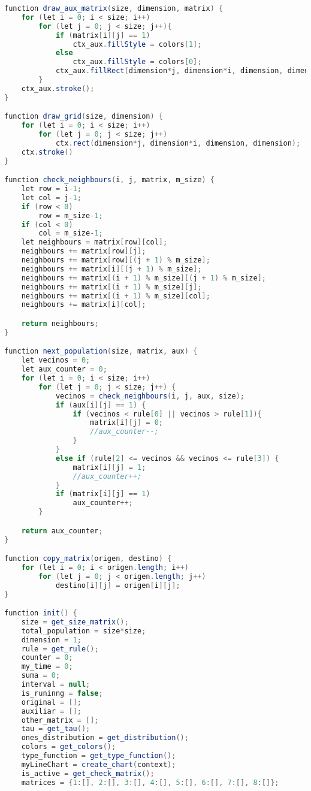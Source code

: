 \documentclass[a4paper,12pt]{article}
\begin{document}
\begin{lstlisting}[language=Java]
function draw_aux_matrix(size, dimension, matrix) {
    for (let i = 0; i < size; i++)
        for (let j = 0; j < size; j++){
            if (matrix[i][j] == 1)
                ctx_aux.fillStyle = colors[1];
            else
                ctx_aux.fillStyle = colors[0];
            ctx_aux.fillRect(dimension*j, dimension*i, dimension, dimension);
        }
    ctx_aux.stroke();
}

function draw_grid(size, dimension) {
    for (let i = 0; i < size; i++)
        for (let j = 0; j < size; j++)
            ctx.rect(dimension*j, dimension*i, dimension, dimension);
    ctx.stroke()
}

function check_neighbours(i, j, matrix, m_size) {
    let row = i-1;
    let col = j-1;
    if (row < 0)
        row = m_size-1;
    if (col < 0)
        col = m_size-1;
    let neighbours = matrix[row][col];
    neighbours += matrix[row][j];
    neighbours += matrix[row][(j + 1) % m_size];
    neighbours += matrix[i][(j + 1) % m_size];
    neighbours += matrix[(i + 1) % m_size][(j + 1) % m_size];
    neighbours += matrix[(i + 1) % m_size][j];
    neighbours += matrix[(i + 1) % m_size][col];
    neighbours += matrix[i][col];

    return neighbours;
}

function next_population(size, matrix, aux) {
    let vecinos = 0;
    let aux_counter = 0;
    for (let i = 0; i < size; i++)
        for (let j = 0; j < size; j++) {
            vecinos = check_neighbours(i, j, aux, size);
            if (aux[i][j] == 1) {
                if (vecinos < rule[0] || vecinos > rule[1]){
                    matrix[i][j] = 0;
                    //aux_counter--;
                }
            } 
            else if (rule[2] <= vecinos && vecinos <= rule[3]) {
                matrix[i][j] = 1;
                //aux_counter++;
            }
            if (matrix[i][j] == 1)
                aux_counter++;
        }

    return aux_counter;
}

function copy_matrix(origen, destino) {
    for (let i = 0; i < origen.length; i++)
        for (let j = 0; j < origen.length; j++)
            destino[i][j] = origen[i][j];
}

function init() {
    size = get_size_matrix();
    total_population = size*size;
    dimension = 1;
    rule = get_rule();
    counter = 0;
    my_time = 0;
    suma = 0;
    interval = null;
    is_runinng = false;
    original = [];
    auxiliar = [];
    other_matrix = [];
    tau = get_tau();
    ones_distribution = get_distribution();
    colors = get_colors();
    type_function = get_type_function();
    myLineChart = create_chart(context);
    is_active = get_check_matrix();
    matrices = {1:[], 2:[], 3:[], 4:[], 5:[], 6:[], 7:[], 8:[]};


\end{lstlisting}
\end{document}
